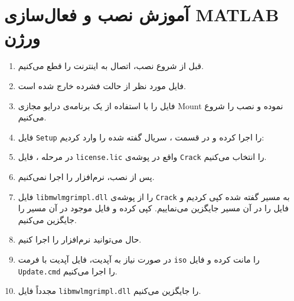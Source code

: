 \section*{آموزش نصب و فعال‌سازی MATLAB ورژن }

\begin{enumerate}
	\item قبل از شروع نصب، اتصال به اینترنت را قطع می‌کنیم.
	\item فایل مورد نظر از حالت فشرده خارج شده است.
	\item فایل  را با استفاده از یک برنامه‌ی درایو مجازی Mount نموده و نصب را شروع می‌کنیم.
	\item فایل \texttt{Setup} را اجرا کرده و در قسمت ، سریال گفته شده را وارد کردیم:
	
	\item در مرحله ، فایل \texttt{license.lic} واقع در پوشه‌ی \texttt{Crack} را انتخاب می‌کنیم.
	\item پس از نصب، نرم‌افزار را اجرا نمی‌کنیم.
	\item فایل \texttt{libmwlmgrimpl.dll} را از پوشه‌ی \texttt{Crack} به مسیر گفته شده کپی کردیم و فایل را در آن مسیر جایگزین می‌نماییم.
	کپی کرده و فایل موجود در آن مسیر را جایگزین می‌کنیم.
	\item حال می‌توانید نرم‌افزار را اجرا کنیم.
	\item در صورت نیاز به آپدیت، فایل آپدیت با فرمت \texttt{iso} را مانت کرده و فایل \texttt{Update.cmd} را اجرا می‌کنیم.
	\item مجدداً فایل \texttt{libmwlmgrimpl.dll} را جایگزین می‌کنیم.
\end{enumerate}
